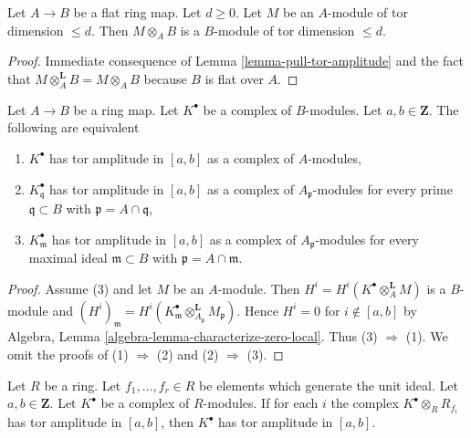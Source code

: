 \begin{lemma}
\label{lemma-flat-base-change-finite-tor-dimension}
Let $A \to B$ be a flat ring map. Let $d \geq 0$.
Let $M$ be an $A$-module of tor dimension $\leq d$.
Then $M \otimes_A B$ is a $B$-module of tor dimension $\leq d$.
\end{lemma}

\begin{proof}
Immediate consequence of
Lemma \ref{lemma-pull-tor-amplitude}
and the fact that $M \otimes_A^{\mathbf{L}} B = M \otimes_A B$
because $B$ is flat over $A$.
\end{proof}

\begin{lemma}
\label{lemma-tor-amplitude-localization}
Let $A  \to B$ be a ring map. Let $K^\bullet$ be a complex of $B$-modules.
Let $a, b \in \mathbf{Z}$. The following are equivalent
\begin{enumerate}
\item $K^\bullet$ has tor amplitude in $[a, b]$ as a complex of $A$-modules,
\item $K^\bullet_\mathfrak q$ has tor amplitude in $[a, b]$ as a complex
of $A_\mathfrak p$-modules for every prime $\mathfrak q \subset B$
with $\mathfrak p = A \cap \mathfrak q$,
\item $K^\bullet_\mathfrak m$ has tor amplitude in $[a, b]$ as a complex
of $A_\mathfrak p$-modules for every maximal ideal $\mathfrak m \subset B$
with $\mathfrak p = A \cap \mathfrak m$.
\end{enumerate}
\end{lemma}

\begin{proof}
Assume (3) and let $M$ be an $A$-module. Then
$H^i = H^i(K^\bullet \otimes_A^\mathbf{L} M)$ is a $B$-module and
$(H^i)_\mathfrak m =
H^i(K^\bullet_\mathfrak m \otimes_{A_\mathfrak p}^\mathbf{L} M_\mathfrak p)$.
Hence $H^i = 0$ for $i \not \in [a, b]$ by
Algebra, Lemma \ref{algebra-lemma-characterize-zero-local}. Thus
(3) $\Rightarrow$ (1). We omit the proofs of (1) $\Rightarrow$ (2)
and (2) $\Rightarrow$ (3).
\end{proof}

\begin{lemma}
\label{lemma-glue-tor-amplitude}
Let $R$ be a ring. Let $f_1, \ldots, f_r \in R$ be elements which
generate the unit ideal. Let $a, b \in \mathbf{Z}$. Let $K^\bullet$
be a complex of $R$-modules. If for each $i$ the complex
$K^\bullet \otimes_R R_{f_i}$ has tor amplitude in $[a, b]$,
then $K^\bullet$ has tor amplitude in $[a, b]$.
\end{lemma}

